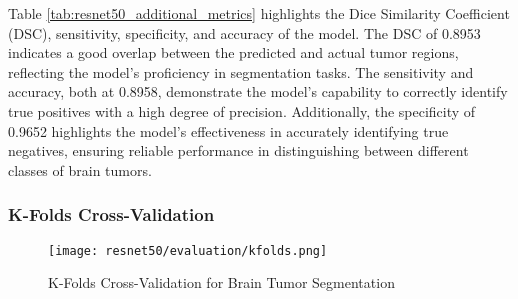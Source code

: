 Table \ref{tab:resnet50_additional_metrics} highlights the Dice Similarity Coefficient (DSC), sensitivity, specificity, and accuracy of the model. The DSC of 0.8953 indicates a good overlap between the predicted and actual tumor regions, reflecting the model's proficiency in segmentation tasks. The sensitivity and accuracy, both at 0.8958, demonstrate the model's capability to correctly identify true positives with a high degree of precision. Additionally, the specificity of 0.9652 highlights the model's effectiveness in accurately identifying true negatives, ensuring reliable performance in distinguishing between different classes of brain tumors.

\subsubsection{K-Folds Cross-Validation}

\begin{figure}[H]
  \begin{center}
    \texttt{[image: resnet50/evaluation/kfolds.png]}
  \end{center}
  \caption{K-Folds Cross-Validation for Brain Tumor Segmentation}\label{f:resnet50_kfolds}
\end{figure}







